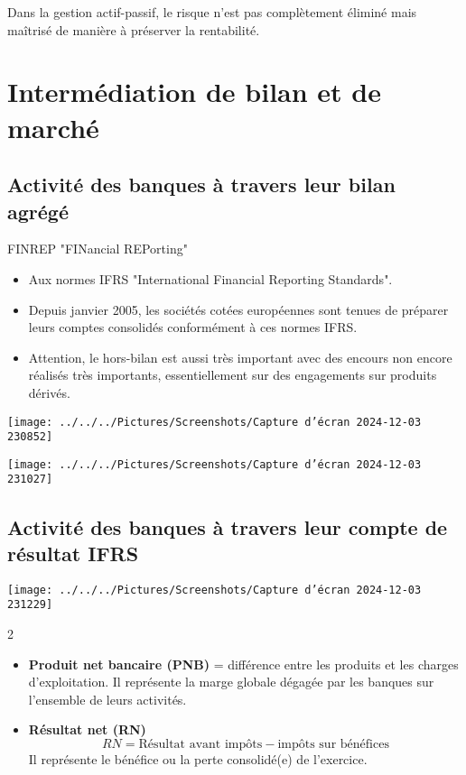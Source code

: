\documentclass[a4paper, 12pt]{report}
\begin{document}
Dans la gestion actif-passif, le risque n’est pas complètement éliminé mais maîtrisé de manière à préserver la rentabilité.


\section{Intermédiation de bilan et de marché}

\subsection{Activité des banques à travers leur bilan agrégé}

FINREP "FINancial REPorting"

\begin{itemize}
	\item Aux normes IFRS "International Financial Reporting Standards".
	\item Depuis janvier 2005, les sociétés cotées européennes sont tenues de préparer leurs comptes consolidés conformément à ces normes IFRS.
	\item Attention, le hors-bilan est aussi très important avec des encours non encore réalisés très importants, essentiellement sur des engagements sur produits dérivés.
\end{itemize}

\begin{center}
	\texttt{[image: ../../../Pictures/Screenshots/Capture d'écran 2024-12-03 230852]}
	
	\texttt{[image: ../../../Pictures/Screenshots/Capture d'écran 2024-12-03 231027]}
\end{center}

\subsection{Activité des banques à travers leur compte de résultat IFRS}

\begin{center}
	\texttt{[image: ../../../Pictures/Screenshots/Capture d'écran 2024-12-03 231229]}
\end{center}
2 

\begin{itemize}
	\item \textbf{Produit net bancaire (PNB)} = différence entre les produits et les charges d’exploitation. Il représente la marge globale dégagée par les banques sur l’ensemble de leurs activités.
	
	\item \textbf{Résultat net (RN)} 
	\[
	RN = \text{Résultat avant impôts} - \text{impôts sur bénéfices}
	\]
	Il représente le bénéfice ou la perte consolidé(e) de l'exercice.
\end{itemize}
\end{document}
